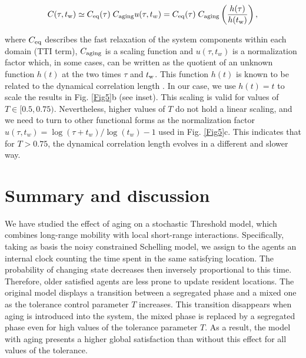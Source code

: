 \begin{equation}
    C (\tau, t_{\rm{w}}) \simeq C_{\rm{eq}}(\tau) \; C_{\rm{aging}} u(\tau,t_w) = C_{\rm{eq}}(\tau) \; C_{\rm{aging}} \left( \frac{h (\tau) }{h(t_{\rm{w}})} \right),
\end{equation}

where $C_{\rm{eq}}$ describes the fast relaxation of the system components within each domain (TTI term), $C_{\rm{aging}}$ is a scaling function and $u(\tau,t_w)$ is a normalization factor which, in some cases, can be written as the quotient of an unknown function $h(t)$ at the two times $\tau$ and $t_{\rm{w}}$. This function $h(t)$ is known to be related to the dynamical correlation length  \cite{Heisemberg,8Heisemberg}. In our case, we use $h(t) = t$ to scale the results in Fig. \ref{Fig5}b (see inset). This scaling is valid for values of $T \in [0.5,0.75)$. Nevertheless, higher values of $T$ do not hold a linear scaling, and we need to turn to other functional forms as the normalization factor $u(\tau,t_w) =  \log(\tau+t_w)/\log(t_w) - 1$ used in  Fig. \ref{Fig5}c. This indicates that for $T > 0.75$, the dynamical correlation length evolves in a different and slower way.

\section{\label{sec:Summary and Conclusions} Summary and discussion}

We have studied the effect of aging on a stochastic Threshold model, which combines long-range mobility with local short-range interactions. Specifically, taking as basis the noisy constrained Schelling model, we assign to the agents an internal clock counting the time spent in the same satisfying location. The probability of changing state decreases then inversely proportional to this time. Therefore,  older satisfied agents are less prone to update resident locations. The original model displays a transition between a segregated phase and a mixed one as the tolerance control parameter $T$ increases. This transition disappears when aging is introduced into the system, the mixed phase is replaced by a segregated phase even for high values of the tolerance parameter $T$. As a result, the model with aging presents a higher global satisfaction than without this effect for all values of the tolerance. 

